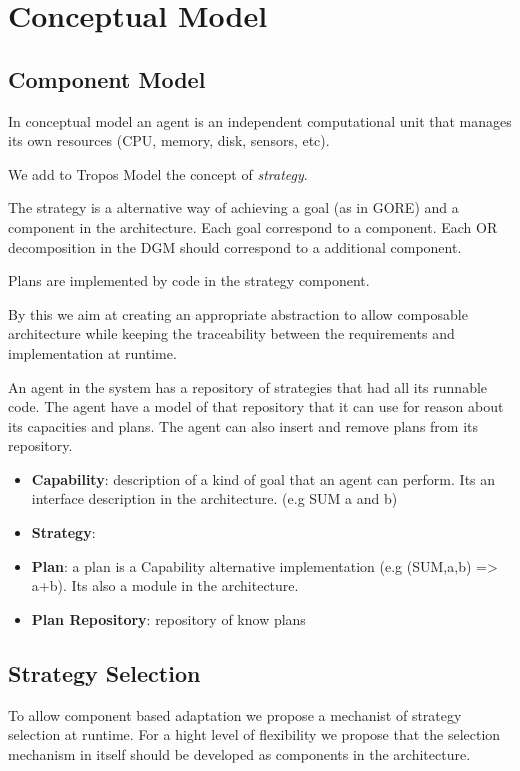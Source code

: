 \section{Conceptual Model}
\label{conceptual_model}

\subsection{Component Model}

In conceptual model an agent is an independent computational unit that manages its own resources (CPU, memory, disk, sensors, etc).

We add to Tropos Model the concept of \textit{strategy}.

The strategy is a alternative way of achieving a goal (as in GORE) and a component in the architecture. Each goal correspond to a component. Each OR decomposition in the DGM should correspond to a additional component.

Plans are implemented by code in the strategy component.

By this we aim at creating an appropriate abstraction to allow composable architecture while keeping the traceability between the requirements and implementation at runtime.

An agent in the system has a repository of strategies that had all its runnable code. The agent have a model of that repository that it can use for reason about its capacities and plans. The agent can also insert and remove plans from its repository.

\begin{itemize}
  \item \textbf{Capability}: description of a kind of goal that an agent can perform. Its an interface description in the architecture. (e.g SUM a and b)
  \item \textbf{Strategy}:
  \item \textbf{Plan}: a plan is a Capability alternative implementation (e.g (SUM,a,b) => {a+b}). Its also a module in the architecture.
  \item \textbf{Plan Repository}: repository of know plans
\end{itemize}

\subsection{Strategy Selection}

To allow component based adaptation we propose a mechanist of strategy selection at runtime.
For a hight level of flexibility we propose that the selection mechanism in itself should be developed as components in the architecture.

